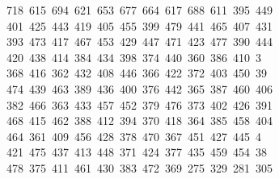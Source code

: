 \begin{tabbing}
\ 718\ 615\ 694\ 621\ 653\ 677\ 664\ 617\ 688\ 611\ 395\ 449\\[0pt]
\>\ 401\ 425\ 443\ 419\ 405\ 455\ 399\ 479\ 441\ 465\ 407\ 431\\[0pt]
\>\ 393\ 473\ 417\ 467\ 453\ 429\ 447\ 471\ 423\ 477\ 390\ 444\ \\[0pt]
\ 420\ 438\ 414\ 384\ 434\ 398\ 374\ 440\ 360\ 386\ 410\ 3\\[0pt]
\ 368\ 416\ 362\ 432\ 408\ 446\ 366\ 422\ 372\ 403\ 450\ 39\\[0pt]
\ 474\ 439\ 463\ 389\ 436\ 400\ 376\ 442\ 365\ 387\ 460\ 406\\[0pt]
\>\ 382\ 466\ 363\ 433\ 457\ 452\ 379\ 476\ 373\ 402\ 426\ 391\\[0pt]
\>\ 468\ 415\ 462\ 388\ 412\ 394\ 370\ 418\ 364\ 385\ 458\ 404\ \\[0pt]
\ 464\ 361\ 409\ 456\ 428\ 378\ 470\ 367\ 451\ 427\ 445\ 4\\[0pt]
\ 421\ 475\ 437\ 413\ 448\ 371\ 424\ 377\ 435\ 459\ 454\ 38\\[0pt]
\ 478\ 375\ 411\ 461\ 430\ 383\ 472\ 369\ 275\ 329\ 281\ 305\\[0pt]

\end{tabbing}
